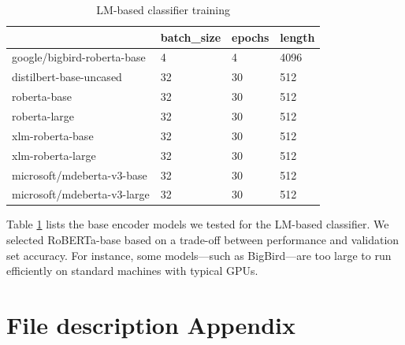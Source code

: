 \documentclass[11pt]{article}
\begin{document}
	\begin{table}[]
		\small
		\caption{LM-based classifier training}
		\begin{tabular}{@{}l|lll@{}}
			\toprule
			& \multicolumn{1}{l|}{batch\_size} & \multicolumn{1}{l|}{epochs} & \multicolumn{1}{l|}{length} \\ \midrule
			\multicolumn{1}{|l|}{google/bigbird-roberta-base} & 4                                & 4                           & 4096                             \\ \cmidrule(r){1-1}
			\multicolumn{1}{|l|}{distilbert-base-uncased}     & 32                               & 30                          & 512                              \\ \cmidrule(r){1-1}
			\multicolumn{1}{|l|}{roberta-base}                & 32                               & 30                          & 512                              \\ 
			\cmidrule(r){1-1}
			\multicolumn{1}{|l|}{roberta-large}                & 32                               & 30                          & 512                              \\ 
			\cmidrule(r){1-1}
			\multicolumn{1}{|l|}{xlm-roberta-base}            & 32                               & 30                          & 512                              \\ \cmidrule(r){1-1}
			\multicolumn{1}{|l|}{xlm-roberta-large}           & 32                               & 30                          & 512                              \\ \cmidrule(r){1-1}
			\multicolumn{1}{|l|}{microsoft/mdeberta-v3-base}  & 32                               & 30                          & 512                              \\ \cmidrule(r){1-1}
			\multicolumn{1}{|l|}{microsoft/mdeberta-v3-large} & 32                               & 30                          & 512                              \\ \bottomrule
		\end{tabular}
		\label{table:3}
	\end{table}
	
	Table \ref{table:3} lists the base encoder models we tested for the LM-based classifier. We selected RoBERTa-base based on a trade-off between performance and validation set accuracy. For instance, some models—such as BigBird—are too large to run efficiently on standard machines with typical GPUs.

	\section{File description Appendix}
	\label{sec:appendix}
	
\end{document}
